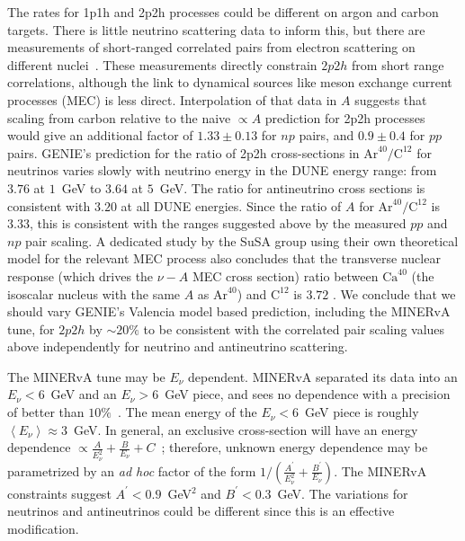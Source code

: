 
 The rates for 1p1h and 2p2h processes could be different on argon and carbon targets.  There is little neutrino scattering data to inform this, but there are measurements of short-ranged correlated pairs from electron scattering on different nuclei~\cite{Colle:2015ena}.  These measurements directly constrain $2p2h$ from short range correlations, although the link to dynamical sources like meson exchange current processes (MEC) is less direct.  Interpolation of that data in $A$ suggests that scaling from carbon relative to the naive $\propto A$ prediction for 2p2h processes would give an additional factor of $1.33\pm 0.13$ for $np$ pairs, and $0.9\pm 0.4$ for $pp$ pairs.
GENIE's prediction for the ratio of 2p2h cross-sections in $\text{Ar}^{40}/\text{C}^{12}$ for neutrinos varies slowly with neutrino energy in the DUNE energy range: from $3.76$ at $1$~GeV to $3.64$ at $5$~GeV. The ratio for antineutrino cross sections is consistent with $3.20$ at all DUNE energies. Since the ratio of $A$ for $\text{Ar}^{40}/\text{C}^{12}$ is $3.33$, this is consistent with the ranges suggested above by the measured $pp$ and $np$ pair scaling.  A dedicated study by the SuSA group using their own theoretical model for the relevant MEC process also concludes that the transverse nuclear response (which drives the $\nu-A$ MEC cross section) ratio between $\text{Ca}^{40}$ (the isoscalar nucleus with the same $A$ as $\text{Ar}^{40}$) and $\text{C}^{12}$ is $3.72$ \cite{Amaro:2017eah}.   We conclude that we should vary GENIE's Valencia model based prediction, including the MINERvA tune, for $2p2h$ by $\sim 20\%$ to be consistent with the correlated pair scaling values above independently for neutrino and antineutrino scattering. 

 The MINERvA tune may be $E_\nu$ dependent. MINERvA separated its data into an $E_\nu<6$~GeV and an $E_\nu>$6~GeV piece, and sees no dependence with a precision of better than $10\%$~\cite{Rodrigues:2015hik}.  The mean energy of the $E_\nu<6$~GeV piece is roughly $\left< E_\nu\right>\approx 3$~GeV.  In general, an exclusive cross-section will have an energy dependence $\propto \frac{A}{E_\nu^2}+\frac{B}{E_\nu}+C$~\cite{llewelyn-smith}; therefore, unknown energy dependence may be parametrized by an {\em ad hoc} factor of the form $1/\left( \frac{A^{'}}{E_\nu^2 }+\frac{B^{'}}{E_\nu}\right)$.  The MINERvA constraints suggest $A^{'}<0.9$~GeV$^2$ and $B^{'}<0.3$~GeV.  The variations for neutrinos and antineutrinos could be different since this is an effective modification.

